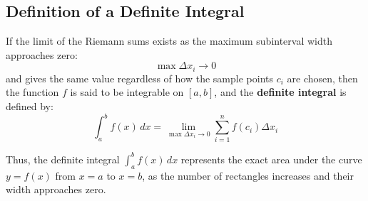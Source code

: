 \documentclass[11pt]{article}
\begin{document}
\subsection{Definition of a Definite Integral}
If the limit of the Riemann sums exists as the maximum subinterval width approaches zero:
\[
    \max \Delta x_i \to 0
\]
and gives the same value regardless of how the sample points $c_i$ are chosen, then the function $f$ is said to be integrable on $[a, b]$, and the \textbf{definite integral} is defined by:
\[
    \int_a^b f(x)\, dx = \lim_{\max \Delta x_i \to 0} \sum_{i=1}^n f(c_i) \Delta x_i
\]
\begin{center}
\end{center}
Thus, the definite integral $\displaystyle\int_a^b f(x)\, dx$ represents the exact area under the curve $y = f(x)$ from $x = a$ to $x = b$, as the number of rectangles increases and their width approaches zero.
\end{document}
